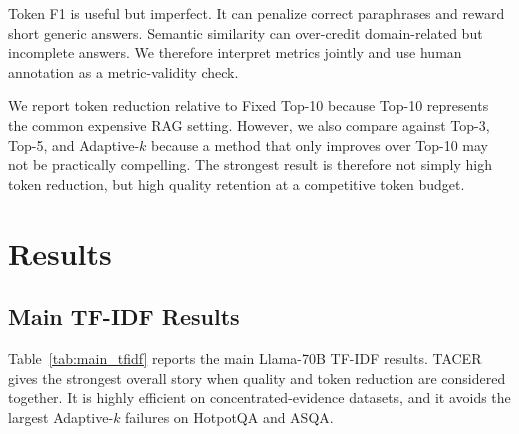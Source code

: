 \documentclass[11pt]{article}
\begin{document}
Token F1 is useful but imperfect. It can penalize correct paraphrases and reward short generic answers. Semantic similarity can over-credit domain-related but incomplete answers. We therefore interpret metrics jointly and use human annotation as a metric-validity check.

We report token reduction relative to Fixed Top-10 because Top-10 represents the common expensive RAG setting. However, we also compare against Top-3, Top-5, and Adaptive-$k$ because a method that only improves over Top-10 may not be practically compelling. The strongest result is therefore not simply high token reduction, but high quality retention at a competitive token budget.

\section{Results}

\subsection{Main TF-IDF Results}

Table~\ref{tab:main_tfidf} reports the main Llama-70B TF-IDF results. TACER gives the strongest overall story when quality and token reduction are considered together. It is highly efficient on concentrated-evidence datasets, and it avoids the largest Adaptive-$k$ failures on HotpotQA and ASQA.

\begin{table}[t]
\centering
\small
\caption{Main Llama-70B TF-IDF results. Reductions are relative to Fixed Top-10.}
\label{tab:main_tfidf}
\end{table}
\end{document}
